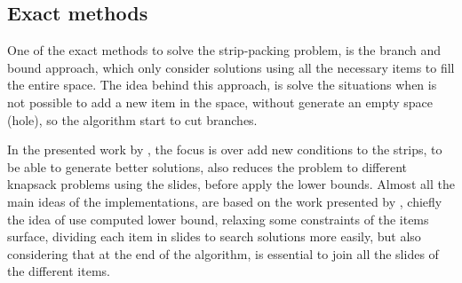 \subsection{Exact methods}

One of the exact methods to solve the strip-packing problem,
is the branch and bound approach,
which only consider solutions using all the necessary items
to fill the entire space.
The idea behind this approach, is solve the situations when
is not possible to add a new item in the space,
without generate an empty space (hole),
so the algorithm start to cut branches.

In the presented work by \cite{alvarez},
the focus is over add new conditions to the strips,
to be able to generate better solutions,
also reduces the problem to different knapsack problems using the slides,
before apply the lower bounds.
Almost all the main ideas of the implementations,
are based on the work presented by \cite{martello},
chiefly the idea of use computed lower bound,
relaxing some constraints of the items surface,
dividing each item in slides to search solutions
more easily, but also considering that at the end of the algorithm,
is essential to join all the slides of the different items.


% 

